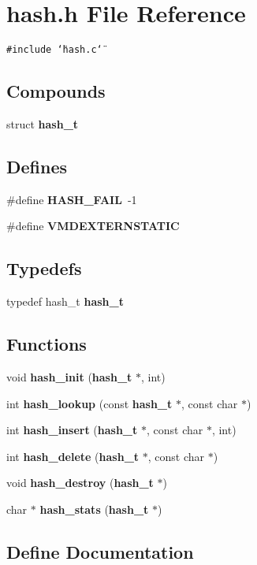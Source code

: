 \section{hash.h File Reference}
\label{hash_8h}
{\tt \#include \char`\"{}hash.c\char`\"{}}\par
\subsection*{Compounds}
\begin{CompactItemize}
\item 
struct {\bf hash\_\-t}
\end{CompactItemize}
\subsection*{Defines}
\begin{CompactItemize}
\item 
\#define {\bf HASH\_\-FAIL}\ -1
\item 
\#define {\bf VMDEXTERNSTATIC}
\end{CompactItemize}
\subsection*{Typedefs}
\begin{CompactItemize}
\item 
typedef hash\_\-t {\bf hash\_\-t}
\end{CompactItemize}
\subsection*{Functions}
\begin{CompactItemize}
\item 
void {\bf hash\_\-init} ({\bf hash\_\-t} $\ast$, int)
\item 
int {\bf hash\_\-lookup} (const {\bf hash\_\-t} $\ast$, const char $\ast$)
\item 
int {\bf hash\_\-insert} ({\bf hash\_\-t} $\ast$, const char $\ast$, int)
\item 
int {\bf hash\_\-delete} ({\bf hash\_\-t} $\ast$, const char $\ast$)
\item 
void {\bf hash\_\-destroy} ({\bf hash\_\-t} $\ast$)
\item 
char $\ast$ {\bf hash\_\-stats} ({\bf hash\_\-t} $\ast$)
\end{CompactItemize}


\subsection{Define Documentation}
